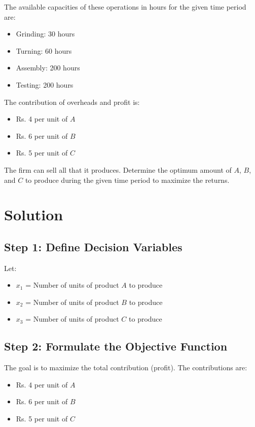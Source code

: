 \documentclass{article}
\begin{document}
The available capacities of these operations in hours for the given time period are:
\begin{itemize}
    \item Grinding: 30 hours
    \item Turning: 60 hours
    \item Assembly: 200 hours
    \item Testing: 200 hours
\end{itemize}

The contribution of overheads and profit is:
\begin{itemize}
    \item Rs. 4 per unit of \( A \)
    \item Rs. 6 per unit of \( B \)
    \item Rs. 5 per unit of \( C \)
\end{itemize}

The firm can sell all that it produces. Determine the optimum amount of \( A \), \( B \), and \( C \) to produce during the given time period to maximize the returns.

\section*{Solution}

\subsection*{Step 1: Define Decision Variables}
Let:
\begin{itemize}
    \item \( x_1 \) = Number of units of product \( A \) to produce
    \item \( x_2 \) = Number of units of product \( B \) to produce
    \item \( x_3 \) = Number of units of product \( C \) to produce
\end{itemize}

\subsection*{Step 2: Formulate the Objective Function}
The goal is to maximize the total contribution (profit). The contributions are:
\begin{itemize}
    \item Rs. 4 per unit of \( A \)
    \item Rs. 6 per unit of \( B \)
    \item Rs. 5 per unit of \( C \)
\end{itemize}
\end{document}
